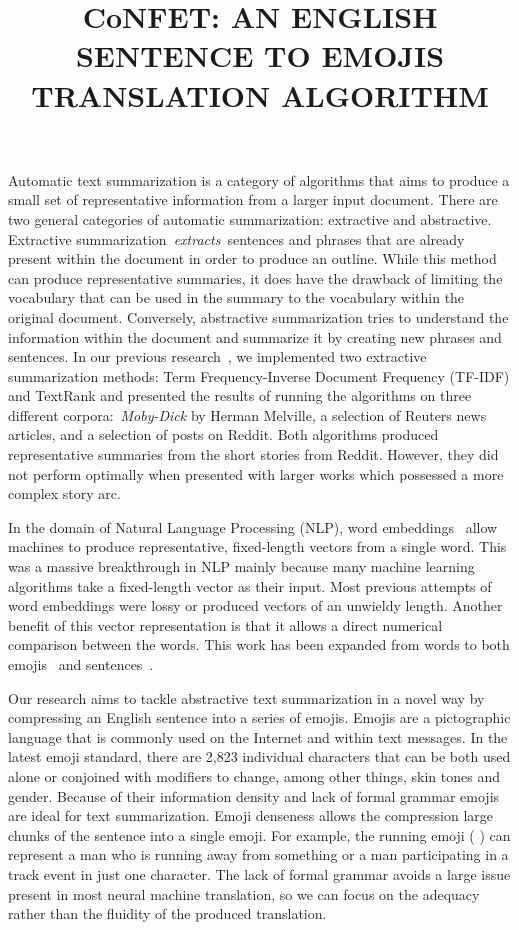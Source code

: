 \documentclass{article}[10]
\newcommand*{\img}[1]{%
  \raisebox{-.3\baselineskip}{%
    \texttt{[image: \#1]}%
  }%
} \title{{CoNFET:} AN ENGLISH SENTENCE TO EMOJIS TRANSLATION ALGORITHM}
\begin{document}
Automatic text summarization is a category of algorithms that aims to produce a
small set of representative information from a larger input document. There are
two general categories of automatic summarization: extractive and abstractive.
Extractive summarization~\emph{extracts~}sentences and phrases that are already
present within the document in order to produce an outline. While this method
can produce representative summaries, it does have the drawback of limiting the
vocabulary that can be used in the summary to the vocabulary within the original
document. Conversely, abstractive summarization tries to understand the
information within the document and summarize it by creating new phrases and
sentences. In our previous research~\cite{day_extractive}, we implemented two
extractive summarization methods: Term Frequency-Inverse Document Frequency
(TF-IDF) and TextRank and presented the results of running the algorithms on
three different corpora:~\emph{Moby-Dick} by Herman Melville, a selection of
Reuters news articles, and a selection of posts on Reddit. Both algorithms
produced representative summaries from the short stories from Reddit. However,
they did not perform optimally when presented with larger works which possessed
a more complex story arc.

In the domain of Natural Language Processing (NLP), word
embeddings~\cite{mikolov2013efficient} allow machines to produce representative,
fixed-length vectors from a single word. This was a massive breakthrough in NLP
mainly because many machine learning algorithms take a fixed-length vector as
their input. Most previous attempts of word embeddings were lossy or produced
vectors of an unwieldy length. Another benefit of this vector representation is
that it allows a direct numerical comparison between the words. This work has
been expanded from words to both emojis~\cite{Eisner_2016} and
sentences~\cite{pg2017unsu}.

Our research aims to tackle abstractive text summarization in a novel way by
compressing an English sentence into a series of emojis. Emojis are a
pictographic language that is commonly used on the Internet and within text
messages. In the latest emoji standard, there are 2,823 individual characters
that can be both used alone or conjoined with modifiers to change, among other
things, skin tones and gender. Because of their information density and lack of
formal grammar emojis are ideal for text summarization. Emoji denseness allows
the compression large chunks of the sentence into a single emoji. For example,
the running emoji (\img{emojis/1f3c3.png}) can represent a man who is running
away from something or a man participating in a track event in just one
character. The lack of formal grammar avoids a large issue present in most
neural machine translation, so we can focus on the adequacy rather than the
fluidity of the produced translation.
\end{document}
